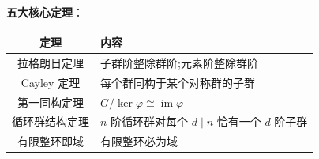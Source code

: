 \textbf{五大核心定理}：

\begin{center}
\begin{tabular}{c|l}
\hline
\textbf{定理} & \textbf{内容} \\
\hline
拉格朗日定理 & 子群阶整除群阶;元素阶整除群阶 \\
Cayley 定理 & 每个群同构于某个对称群的子群 \\
第一同构定理 & $G/\ker\varphi \cong \operatorname{im}\varphi$ \\
循环群结构定理 & $n$ 阶循环群对每个 $d\mid n$ 恰有一个 $d$ 阶子群 \\
有限整环即域 & 有限整环必为域 \\
\hline
\end{tabular}
\end{center}
